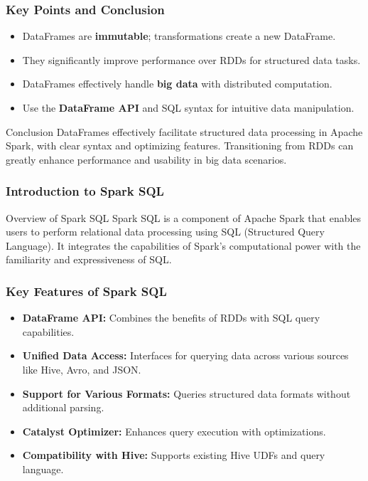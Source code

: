 \documentclass[aspectratio=169]{beamer}
\begin{document}
\begin{frame}
    \frametitle{Key Points and Conclusion}
    \begin{itemize}
        \item DataFrames are \textbf{immutable}; transformations create a new DataFrame.
        \item They significantly improve performance over RDDs for structured data tasks.
        \item DataFrames effectively handle \textbf{big data} with distributed computation.
        \item Use the \textbf{DataFrame API} and SQL syntax for intuitive data manipulation.
    \end{itemize}
    
    \begin{block}{Conclusion}
        DataFrames effectively facilitate structured data processing in Apache Spark, with clear syntax and optimizing features. Transitioning from RDDs can greatly enhance performance and usability in big data scenarios.
    \end{block}
\end{frame}

\begin{frame}
    \frametitle{Introduction to Spark SQL}
    \begin{block}{Overview of Spark SQL}
        Spark SQL is a component of Apache Spark that enables users to perform relational data processing using SQL (Structured Query Language). It integrates the capabilities of Spark's computational power with the familiarity and expressiveness of SQL.
    \end{block}
\end{frame}

\begin{frame}
    \frametitle{Key Features of Spark SQL}
    \begin{itemize}
        \item \textbf{DataFrame API:} Combines the benefits of RDDs with SQL query capabilities.
        \item \textbf{Unified Data Access:} Interfaces for querying data across various sources like Hive, Avro, and JSON.
        \item \textbf{Support for Various Formats:} Queries structured data formats without additional parsing.
        \item \textbf{Catalyst Optimizer:} Enhances query execution with optimizations.
        \item \textbf{Compatibility with Hive:} Supports existing Hive UDFs and query language.
    \end{itemize}
\end{frame}
\end{document}
